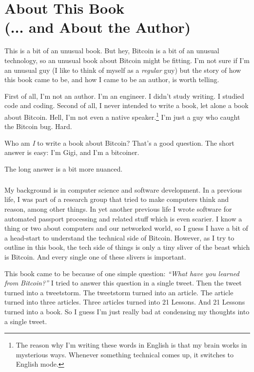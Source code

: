 
\def\bitcoinB{\leavevmode
  {\setbox0=\hbox{\textsf{B}}%
    \dimen0\ht0 \advance\dimen0 0.2ex
    \ooalign{\hfil \box0\hfil\cr
      \hfil\vrule height \dimen0 depth.2ex\hfil\cr
    }%
  }%
}

\chapter*{About This Book \\ (... and About the Author)}

This is a bit of an unusual book. But hey, Bitcoin is a bit of an unusual
technology, so an unusual book about Bitcoin might be fitting. I'm not sure if
I'm an unusual guy (I like to think of myself as a \textit{regular} guy) but the
story of how this book came to be, and how I came to be an author, is worth
telling.

First of all, I'm not an author. I'm an engineer. I didn't study writing. I
studied code and coding. Second of all, I never intended to write a book, let
alone a book about Bitcoin. Hell, I'm not even a native speaker.\footnote{The
reason why I'm writing these words in English is that my brain works in
mysterious ways. Whenever something technical comes up, it switches to English
mode.} I'm just a guy who caught the Bitcoin bug. Hard.

Who am \textit{I} to write a book about Bitcoin? That's a good question. The
short answer is easy: I'm Gigi, and I'm a bitcoiner.

The long answer is a bit more nuanced.

\paragraph{}
My background is in computer science and software development. In a
previous life, I was part of a research group that tried to make computers think
and reason, among other things. In yet another previous life I wrote software
for automated passport processing and related stuff which is even scarier. I
know a thing or two about computers and our networked world, so I guess I have a
bit of a head-start to understand the technical side of Bitcoin. However, as I
try to outline in this book, the tech side of things is only a tiny sliver of
the beast which is Bitcoin. And every single one of these slivers is important.

This book came to be because of one simple question: \textit{\enquote{What have
you learned from Bitcoin?}} I tried to answer this question in a single tweet.
Then the tweet turned into a tweetstorm. The tweetstorm turned into an article.
The article turned into three articles. Three articles turned into 21 Lessons.
And 21 Lessons turned into a book. So I guess I'm just really bad at condensing
my thoughts into a single tweet.

